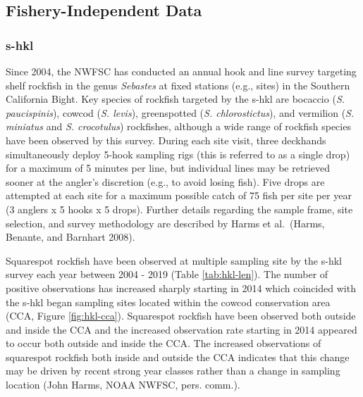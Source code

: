 \documentclass[11pt,
  english,
  a4paper,
]{article}
\begin{document}
\leavevmode\tagmcend\tagstructend\par


\hypertarget{fishery-independent-data}{%
\subsection{Fishery-Independent Data}\label{fishery-independent-data}}

\leavevmode\tagmcend\tagstructend


\hypertarget{section}{%
\subsubsection{\texorpdfstring{\acrlong{s-hkl}}{}}\label{section}}

\leavevmode\tagmcend\tagstructend


Since 2004, the NWFSC has conducted an annual hook and line survey targeting shelf rockfish in the genus \emph{Sebastes} at fixed stations (e.g., sites) in the Southern California Bight. Key species of rockfish targeted by the \Gls{s-hkl} are bocaccio (\emph{S. paucispinis}), cowcod (\emph{S. levis}), greenspotted (\emph{S. chlorostictus}), and vermilion (\emph{S. miniatus} and \emph{S. crocotulus}) rockfishes, although a wide range of rockfish species have been observed by this survey. During each site visit, three deckhands simultaneously deploy 5-hook sampling rigs (this is referred to as a single drop) for a maximum of 5 minutes per line, but individual lines may be retrieved sooner at the angler's discretion (e.g., to avoid losing fish). Five drops are attempted at each site for a maximum possible catch of 75 fish per site per year (3 anglers x 5 hooks x 5 drops). Further details regarding the sample frame, site selection, and survey methodology are described by Harms et al.~{(Harms, Benante, and Barnhart 2008)\leavevmode\tagmcend\tagstructend}.

\leavevmode\tagmcend\tagstructend\par


Squarespot rockfish have been observed at multiple sampling site by the \Gls{s-hkl} survey each year between 2004 - 2019 (Table \ref{tab:hkl-len}). The number of positive observations has increased sharply starting in 2014 which coincided with the \Gls{s-hkl} began sampling sites located within the cowcod conservation area (CCA, Figure \ref{fig:hkl-cca}). Squarespot rockfish have been observed both outside and inside the CCA and the increased observation rate starting in 2014 appeared to occur both outside and inside the CCA. The increased observations of squarespot rockfish both inside and outside the CCA indicates that this change may be driven by recent strong year classes rather than a change in sampling location (John Harms, NOAA NWFSC, pers. comm.).
\end{document}
